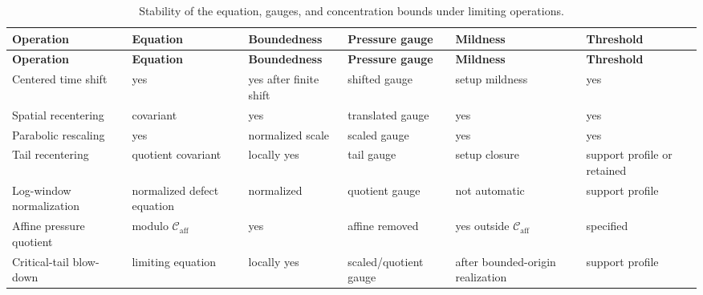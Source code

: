 \documentclass[11pt]{amsart}
\numberwithin{equation}{section}
\theoremstyle{plain}
\theoremstyle{definition}
\theoremstyle{remark}
\newcommand{\Caff}{\mathcal C_{\mathrm{aff}}}
\begin{document}
\begingroup
\footnotesize
\setlength{\tabcolsep}{2pt}
\begin{longtable}{@{}L{0.20\textwidth}L{0.17\textwidth}L{0.14\textwidth}L{0.15\textwidth}L{0.17\textwidth}L{0.11\textwidth}@{}}
\caption{Stability of the equation, gauges, and concentration bounds under limiting operations.}
\label{tab:ancestor-heredity-table}\\
\hline
\textbf{Operation} & \textbf{Equation} & \textbf{Boundedness} &
\textbf{Pressure gauge} & \textbf{Mildness} & \textbf{Threshold}\\
\hline
\endfirsthead
\hline
\textbf{Operation} & \textbf{Equation} & \textbf{Boundedness} &
\textbf{Pressure gauge} & \textbf{Mildness} & \textbf{Threshold}\\
\hline
\endhead
\hline
\endfoot
Centered time shift & yes & yes after finite shift & shifted gauge &
setup mildness & yes\\
Spatial recentering & covariant & yes & translated gauge & yes & yes\\
Parabolic rescaling & yes & normalized scale & scaled gauge & yes & yes\\
Tail recentering & quotient covariant & locally yes & tail gauge & setup
closure & support profile or retained\\
Log-window normalization & normalized defect equation & normalized & quotient
gauge & not automatic & support profile\\
Affine pressure quotient & modulo \(\Caff\) & yes & affine removed & yes
outside \(\Caff\) & specified\\
Critical-tail blow-down & limiting equation & locally yes & scaled/quotient
gauge & after bounded-origin realization & support profile\\
\hline
\end{longtable}
\endgroup
\end{document}
